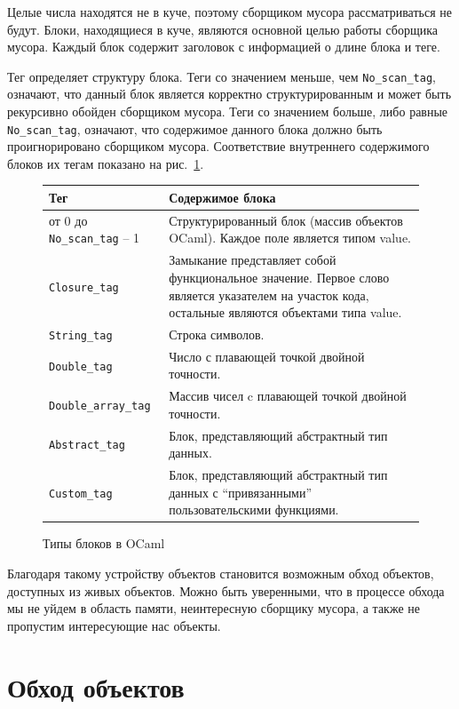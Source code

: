 Целые числа находятся не в куче, поэтому сборщиком мусора рассматриваться не будут. Блоки, находящиеся в куче, являются основной целью работы сборщика
мусора. Каждый блок содержит заголовок с информацией о длине блока и теге.

Тег определяет структуру блока. Теги со значением меньше, чем \texttt{No\_scan\_tag}, 
означают, что данный блок является корректно структурированным и может быть рекурсивно обойден сборщиком мусора. 
Теги со значением больше, либо равные \texttt{No\_scan\_tag}, означают, что содержимое данного блока должно быть проигнорировано сборщиком мусора. 
Соответствие внутреннего содержимого блоков их тегам показано на рис.~\ref{block_types}.

\begin{figure}[t]
    \begin{tabular}{|l| p{6cm}|}
    \hline
    Тег & Содержимое блока \\
    \hline
    от 0 до \texttt{No\_scan\_tag} -- 1 & Структурированный блок (массив объектов OCaml). Каждое поле является типом value.\\
    \hline
    \texttt{Closure\_tag} & Замыкание представляет собой функциональное значение. Первое слово является указателем на участок кода,
    остальные являются объектами типа value.\\
    \hline
    \texttt{String\_tag} & Строка символов. \\
    \hline
    \texttt{Double\_tag} & Число с плавающей точкой двойной точности. \\
    \hline
    \texttt{Double\_array\_tag} & Массив чисел c плавающей точкой двойной точности. \\
    \hline
    \texttt{Abstract\_tag} & Блок, представляющий абстрактный тип данных. \\
    \hline
    \texttt{Custom\_tag} & Блок, представляющий абстрактный тип данных
    с ``привязанными'' пользовательскими функциями. \\
    \hline
    \end{tabular}
    \caption{Типы блоков в OCaml}
    \label{block_types}
\end{figure}

Благодаря такому устройству объектов становится возможным обход объектов, доступных из живых объектов. Можно быть уверенными,
что в процессе обхода мы не уйдем в область памяти, неинтересную сборщику мусора, а также не пропустим интересующие нас объекты. 

\section{Обход объектов}

